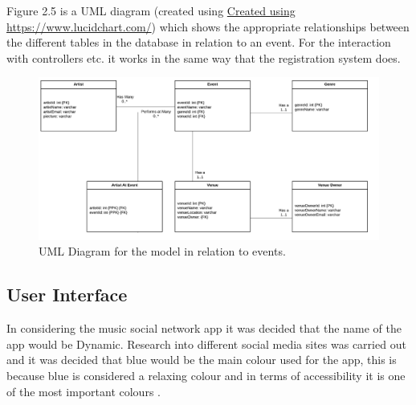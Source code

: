 Figure 2.5 is a UML diagram (created using \url{Created using https://www.lucidchart.com/}) which shows the appropriate relationships between the different tables in the database in relation to an event. For the interaction with controllers etc. it works in the same way that the registration system does.
\begin{figure}[H]
\includegraphics[width=\textwidth,height=\textheight,keepaspectratio]{images/events}
\caption{UML Diagram for the model in relation to events.}
\end{figure}


\subsection{User Interface}
In considering the music social network app it was decided that the name of the app would be Dynamic. Research into different social media sites was carried out and it was decided that blue would be the main colour used for the app, this is because blue is considered a relaxing colour and in terms of accessibility it is one of the most important colours \cite{col}.
